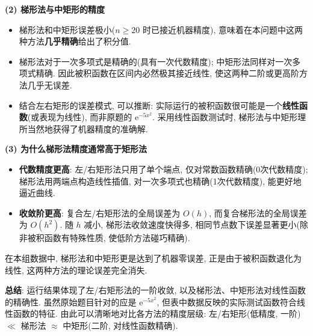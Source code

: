 \documentclass[12pt,a4paper]{ctexart}
\begin{document}
\textbf{(2) 梯形法与中矩形的精度}
\begin{itemize}
    \item 梯形法和中矩形误差极小($n\ge20$ 时已接近机器精度), 意味着在本问题中这两种方法\textbf{几乎精确}给出了积分值. 
    \item 梯形法对于一次多项式是精确的(具有一次代数精度); 中矩形法同样对一次多项式精确. 因此被积函数在区间内必然极其接近线性, 使这两种二阶或更高阶方法几乎无误差. 
    \item 结合左右矩形的误差模式, 可以推断: 实际运行的被积函数很可能是一个\textbf{线性函数}(或表现为线性), 而非原题的 $\mathrm{e}^{-5x^2}$. 采用线性函数测试时, 梯形法与中矩形理所当然地获得了机器精度的准确解. 
\end{itemize}

\textbf{(3) 为什么梯形法精度通常高于矩形法}
\begin{itemize}
    \item \textbf{代数精度更高}: 左/右矩形法只用了单个端点, 仅对常数函数精确(0次代数精度); 梯形法用两端点构造线性插值, 对一次多项式也精确(1次代数精度), 能更好地逼近曲线. 
    \item \textbf{收敛阶更高}: 复合左/右矩形法的全局误差为 $O(h)$, 而复合梯形法的全局误差为 $O(h^2)$. 随 $h$ 减小, 梯形法收敛速度快得多, 相同节点数下误差显著更小(除非被积函数有特殊性质, 使低阶方法碰巧精确). 
\end{itemize}

在本组数据中, 梯形法和中矩形更是达到了机器零误差, 正是由于被积函数退化为线性, 这两种方法的理论误差完全消失. 

\textbf{总结}: 运行结果体现了左/右矩形法的一阶收敛, 以及梯形法、中矩形法对线性函数的精确性. 虽然原始题目针对的应是 $\mathrm{e}^{-5x^2}$, 但表中数据反映的实际测试函数符合线性函数的特征. 由此可以清晰地对比各方法的精度层级: 左/右矩形(低精度, 一阶) $\ll$ 梯形法 $\approx$ 中矩形(二阶, 对线性函数精确). 
\end{document}
